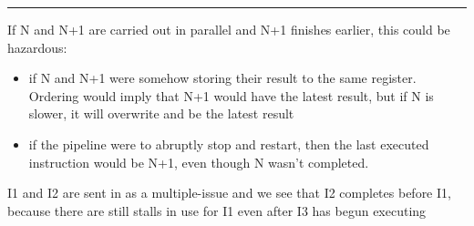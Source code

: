 \documentclass[11pt]{exam}
\newcounter{questionCounter}
\newcounter{partCounter}[questionCounter]
\newenvironment{namedquestion}[1]{%
    \addtocounter{questionCounter}{1}%
    \setcounter{partCounter}{0}%
    \vspace{.2in}%
        \noindent{\bf #1}%
    \vspace{0.3em} \hrule \vspace{.1in}%
}{}
\begin{document}
\begin{namedquestion}{Problem 3.4}

If N and N+1 are carried out in parallel and N+1 finishes earlier, this could be hazardous: 
\begin{itemize}
\item if N and N+1 were somehow storing their result to the same register. Ordering would imply that N+1 would have the latest result, but if N is slower, it will overwrite and be the latest result
\item if the pipeline were to abruptly stop and restart, then the last executed instruction would be N+1, even though N wasn't completed. 
\end{itemize}

I1 and I2 are sent in as a multiple-issue and we see that I2 completes before I1, because there are still stalls in use for I1 even after I3 has begun executing

\end{namedquestion}
\end{document}
